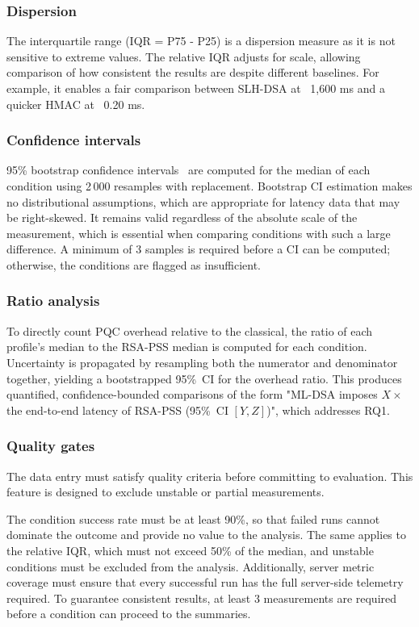 \documentclass[12pt,a4paper]{article}
\begin{document}
\subsubsection{Dispersion} The interquartile range (IQR = P75 - P25) is a dispersion measure as it is not sensitive to extreme values. The relative IQR adjusts for scale, allowing comparison of how consistent the results are despite different baselines. For example, it enables a fair comparison between SLH-DSA at ~1,600 ms and a quicker HMAC at ~0.20 ms.

\subsubsection{Confidence intervals} 95\% bootstrap confidence intervals~\cite{efron1979bootstrap,efron1993introduction} are computed for the median of each condition using 2\,000 resamples with replacement. Bootstrap CI estimation makes no distributional assumptions, which are appropriate for latency data that may be right-skewed. It remains valid regardless of the absolute scale of the measurement, which is essential when comparing conditions with such a large difference. A minimum of 3 samples is required before a CI can be computed; otherwise, the conditions are flagged as insufficient.

\subsubsection{Ratio analysis} To directly count PQC overhead relative to the classical, the ratio of each profile's median to the RSA-PSS median is computed for each condition. Uncertainty is propagated by resampling both the numerator and denominator together, yielding a bootstrapped 95\%~CI for the overhead ratio. This produces quantified, confidence-bounded comparisons of the form "ML-DSA imposes $X\times$ the end-to-end latency of RSA-PSS (95\%~CI $[Y, Z]$)", which addresses RQ1.

\subsubsection{Quality gates} The data entry must satisfy quality criteria before committing to evaluation. This feature is designed to exclude unstable or partial measurements.

The condition success rate must be at least 90\%, so that failed runs cannot dominate the outcome and provide no value to the analysis. The same applies to the relative IQR, which must not exceed 50\% of the median, and unstable conditions must be excluded from the analysis. Additionally, server metric coverage must ensure that every successful run has the full server-side telemetry required. To guarantee consistent results, at least 3 measurements are required before a condition can proceed to the summaries.
\end{document}
